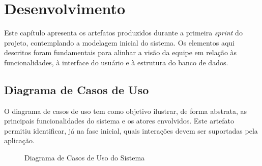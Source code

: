 \chapter{Desenvolvimento}\label{cap:desenvolvimento}

Este capítulo apresenta os artefatos produzidos durante a primeira \textit{sprint} do projeto, contemplando a modelagem inicial do sistema. Os elementos aqui descritos foram fundamentais para alinhar a visão da equipe em relação às funcionalidades, à interface do usuário e à estrutura do banco de dados.

\section{Diagrama de Casos de Uso}
O diagrama de casos de uso tem como objetivo ilustrar, de forma abstrata, as principais funcionalidades do sistema e os atores envolvidos. Este artefato permitiu identificar, já na fase inicial, quais interações devem ser suportadas pela aplicação.

\begin{figure}[H]
    \centering
    
    \caption{Diagrama de Casos de Uso do Sistema}
    \label{fig:casos_uso}
\end{figure}

